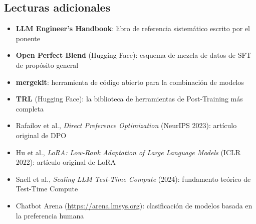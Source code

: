 \subsection{Lecturas adicionales}

\begin{itemize}
    \item \textbf{LLM Engineer's Handbook}: libro de referencia sistemático escrito por el ponente
    \item \textbf{Open Perfect Blend} (Hugging Face): esquema de mezcla de datos de SFT de propósito general
    \item \textbf{mergekit}: herramienta de código abierto para la combinación de modelos
    \item \textbf{TRL} (Hugging Face): la biblioteca de herramientas de Post-Training más completa
    \item Rafailov et al., \textit{Direct Preference Optimization} (NeurIPS 2023): artículo original de DPO
    \item Hu et al., \textit{LoRA: Low-Rank Adaptation of Large Language Models} (ICLR 2022): artículo original de LoRA
    \item Snell et al., \textit{Scaling LLM Test-Time Compute} (2024): fundamento teórico de Test-Time Compute
    \item Chatbot Arena (\url{https://arena.lmsys.org}): clasificación de modelos basada en la preferencia humana
\end{itemize}



